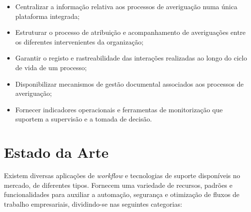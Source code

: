 \begin{itemize}
\item Centralizar a informação relativa aos processos de averiguação numa única plataforma integrada;

\item Estruturar o processo de atribuição e acompanhamento de averiguações entre os diferentes intervenientes da organização;

\item Garantir o registo e rastreabilidade das interações realizadas ao longo do ciclo de vida de um processo;

\item Disponibilizar mecanismos de gestão documental associados aos processos de averiguação;

\item Fornecer indicadores operacionais e ferramentas de monitorização que suportem a supervisão e a tomada de decisão.

\end{itemize}

\newpage


\section{Estado da Arte}
\label{sec:estado_da_arte}

Existem diversas aplicações de \textit{workflow} e tecnologias de suporte disponíveis no mercado, de diferentes tipos. Fornecem uma variedade de recursos, padrões e funcionalidades para auxiliar a automação, segurança e otimização de fluxos de trabalho empresariais, dividindo-se nas seguintes categorias:

